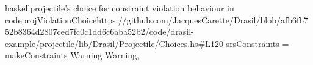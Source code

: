 \begin{codeSnippet}{haskell}{\acs{projectile}'s choice for constraint violation behaviour in code}{projViolationChoice}{https://github.com/JacquesCarette/Drasil/blob/afb6fb752b8364d2807ced7fc0c1dd6c6aba52b2/code/drasil-example/projectile/lib/Drasil/Projectile/Choices.hs\#L120}
    srsConstraints = makeConstraints Warning Warning,
\end{codeSnippet}
